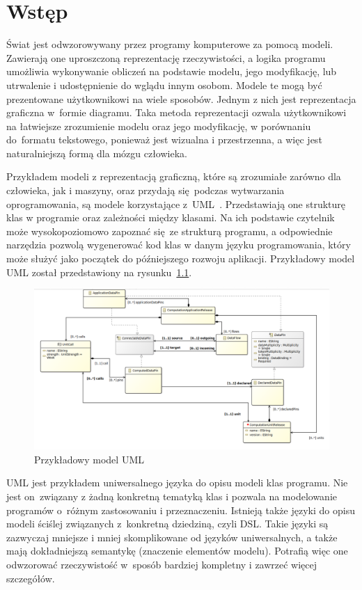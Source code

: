 \chapter{Wstęp}

Świat jest odwzorowywany przez programy komputerowe za pomocą modeli.
Zawierają one uproszczoną reprezentację rzeczywistości, a logika programu
umożliwia wykonywanie obliczeń na podstawie modelu, jego modyfikację, lub
utrwalenie i udostępnienie do wglądu innym osobom.
Modele te mogą być prezentowane użytkownikowi na wiele sposobów. Jednym z nich
jest reprezentacja graficzna w~formie diagramu. Taka metoda reprezentacji
ozwala użytkownikowi na łatwiejsze zrozumienie modelu
oraz jego modyfikację, w porównaniu do~formatu tekstowego, ponieważ jest
wizualna i przestrzenna, a więc jest naturalniejszą formą dla mózgu człowieka.

Przykładem modeli z reprezentacją graficzną, które są zrozumiałe zarówno dla
człowieka, jak i maszyny, oraz
przydają się podczas wytwarzania oprogramowania, są modele korzystające
z~\gls{UML}~\cite{wikipedia-uml}. Przedstawiają
one strukturę klas w programie oraz zależności między klasami. Na ich podstawie
czytelnik może wysokopoziomowo zapoznać się~ze strukturą programu, a
odpowiednie narzędzia pozwolą wygenerować kod klas w danym języku
programowania, który może służyć jako początek do późniejszego rozwoju
aplikacji. Przykładowy model \gls{UML} został przedstawiony na
rysunku~\ref{rys:przykladowy-model-uml}.

\begin{figure}[!hb]
	\centering
	\includegraphics[width=0.95\linewidth]{./images/example-uml-model.png}
	\caption{Przykładowy model \gls{UML}}\label{rys:przykladowy-model-uml}
\end{figure}

\gls{UML} jest przykładem uniwersalnego języka do opisu modeli klas programu.
Nie jest on~związany z żadną konkretną tematyką klas i pozwala na modelowanie
programów o~różnym zastosowaniu i przeznaczeniu. Istnieją także języki do opisu
modeli ściślej związanych z~konkretną dziedziną, czyli \gls{DSL}. Takie języki
są zazwyczaj mniejsze i mniej skomplikowane od języków uniwersalnych, a także
mają dokładniejszą semantykę (znaczenie elementów modelu). Potrafią więc one
odwzorować rzeczywistość w~sposób bardziej kompletny i zawrzeć więcej
szczegółów.

